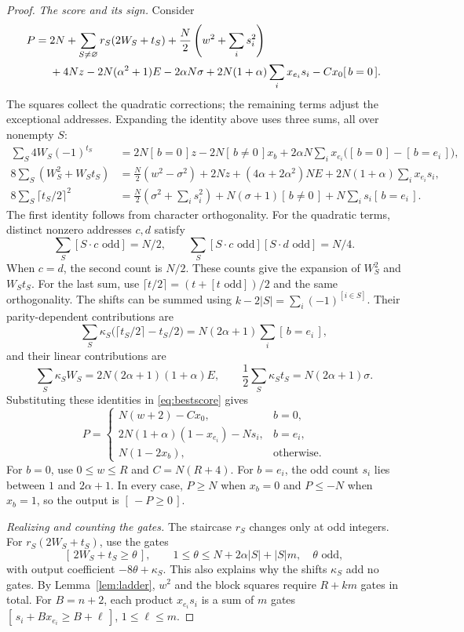 \documentclass[11pt]{article}
\newcommand{\ind}[1]{[\,#1\,]}
\begin{document}
\begin{proof}
\emph{The score and its sign.}
Consider
\begin{align}\label{eq:bestscore}
P={}&2N+\sum_{S\ne\varnothing}r_S(2W_S+t_S)
 +\frac N2\left(w^2+\sum_i s_i^2\right)\notag\\
 &+4Nz-2N(\alpha^2+1)E-2\alpha N\sigma
 +2N(1+\alpha)\sum_i x_{e_i}s_i-Cx_0\ind{b=0}.
\end{align}
The squares collect the quadratic corrections; the remaining terms
adjust the exceptional addresses. Expanding the identity above uses
three sums, all over nonempty $S$:
\begin{align*}
\sum_S4W_S(-1)^{t_S}
 &=2N\ind{b=0}z-2N\ind{b\ne0}x_b
   +2\alpha N\sum_i x_{e_i}\bigl(\ind{b=0}-\ind{b=e_i}\bigr),\\
8\sum_S(W_S^2+W_St_S)
 &=\frac N2(w^2-\sigma^2)+2Nz+(4\alpha+2\alpha^2)NE
   +2N(1+\alpha)\sum_i x_{e_i}s_i,\\
8\sum_S\lceil t_S/2\rceil^2
 &=\frac N2\left(\sigma^2+\sum_i s_i^2\right)
   +N(\sigma+1)\ind{b\ne0}+N\sum_i s_i\ind{b=e_i}.
\end{align*}
The first identity follows from character orthogonality. For the
quadratic terms, distinct nonzero addresses $c,d$ satisfy
$$\sum_S[S\cdot c\text{ odd}]=N/2,\qquad
\sum_S[S\cdot c\text{ odd}][S\cdot d\text{ odd}]=N/4.$$
When $c=d$, the second count is $N/2$. These counts give the expansion
of $W_S^2$ and $W_St_S$. For the last sum, use
$\lceil t/2\rceil=(t+[t\text{ odd}])/2$ and the same orthogonality.
The shifts can be summed using $k-2|S|=\sum_i(-1)^{[i\in S]}$.
Their parity-dependent contributions are
$$
\sum_S\kappa_S\bigl(\lceil t_S/2\rceil-t_S/2\bigr)
 =N(2\alpha+1)\sum_i\ind{b=e_i},
$$
and their linear contributions are
$$\sum_S\kappa_SW_S=2N(2\alpha+1)(1+\alpha)E,\qquad
\frac12\sum_S\kappa_St_S=N(2\alpha+1)\sigma.$$
Substituting these identities in \eqref{eq:bestscore} gives
\begin{equation}\label{eq:bestclosed}
P=\begin{cases}
N(w+2)-Cx_0,&b=0,\\
2N(1+\alpha)(1-x_{e_i})-Ns_i,&b=e_i,\\
N(1-2x_b),&\text{otherwise}.
\end{cases}
\end{equation}
For $b=0$, use $0\le w\le R$ and $C=N(R+4)$. For $b=e_i$, the odd
count $s_i$ lies between $1$ and $2\alpha+1$. In every case, $P\ge N$
when $x_b=0$ and $P\le-N$ when $x_b=1$, so the output is
$\ind{-P\ge0}$.

\emph{Realizing and counting the gates.}
The staircase $r_S$ changes only at odd integers. For
$r_S(2W_S+t_S)$, use the gates
$$
\ind{2W_S+t_S\ge\theta},\qquad
1\le\theta\le N+2\alpha|S|+|S|m,\quad \theta\text{ odd},
$$
with output coefficient $-8\theta+\kappa_S$. This also explains why
the shifts $\kappa_S$ add no gates. By Lemma~\ref{lem:ladder}, $w^2$
and the block squares require $R+km$ gates in total.
For $B=n+2$, each product $x_{e_i}s_i$ is a sum of $m$ gates
$\ind{s_i+Bx_{e_i}\ge B+\ell}$, $1\le\ell\le m$.


\end{proof}
\end{document}
